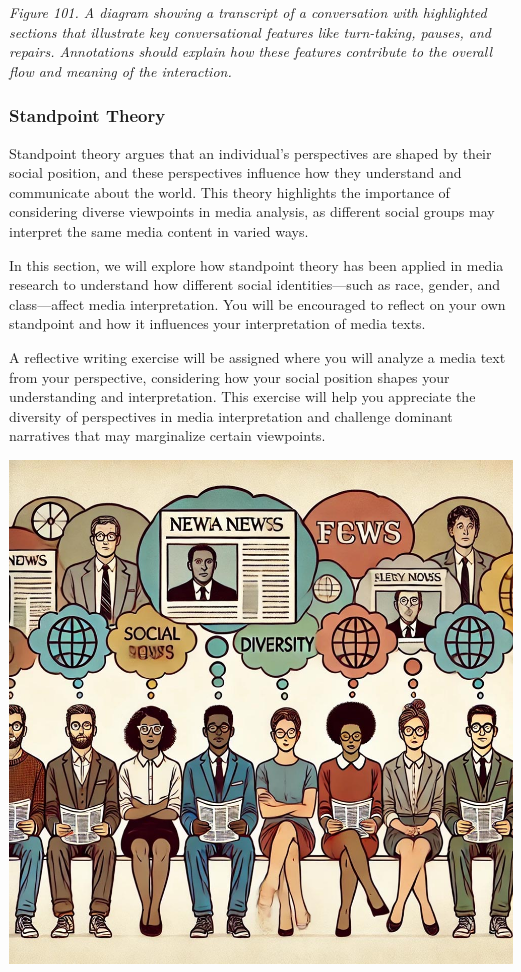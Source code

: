 \documentclass[
]{book}
\begin{document}
\emph{Figure 101. A diagram showing a transcript of a conversation with highlighted sections that illustrate key conversational features like turn-taking, pauses, and repairs. Annotations should explain how these features contribute to the overall flow and meaning of the interaction.}

\subsubsection{Standpoint Theory}\label{standpoint-theory}

Standpoint theory argues that an individual's perspectives are shaped by their social position, and these perspectives influence how they understand and communicate about the world. This theory highlights the importance of considering diverse viewpoints in media analysis, as different social groups may interpret the same media content in varied ways.

In this section, we will explore how standpoint theory has been applied in media research to understand how different social identities---such as race, gender, and class---affect media interpretation. You will be encouraged to reflect on your own standpoint and how it influences your interpretation of media texts.

A reflective writing exercise will be assigned where you will analyze a media text from your perspective, considering how your social position shapes your understanding and interpretation. This exercise will help you appreciate the diversity of perspectives in media interpretation and challenge dominant narratives that may marginalize certain viewpoints.

\includegraphics[width=1\linewidth,height=\textheight,keepaspectratio]{images/fig102.jpg}
\end{document}
